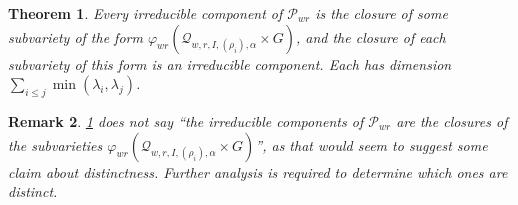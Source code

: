 \documentclass[12pt,psamsfonts]{article}
\newtheorem{theorem}{Theorem}[section]
\newtheorem{remark}[theorem]{Remark}
\begin{document}
\begin{theorem}\label{pwr_comps}
    Every irreducible component of \(\mathcal{P}_{wr}\) is the closure of some subvariety of the form \(\varphi_{wr}(\mathcal{Q}_{w,r,I,(\rho_i),\alpha} \times G)\), and the closure of each subvariety of this form is an irreducible component.
    Each has dimension \(\sum_{i \leq j} \min(\lambda_i, \lambda_j)\).
\end{theorem}
\begin{remark}
    \cref{pwr_comps} does not say ``the irreducible components of \(\mathcal{P}_{wr}\) are the closures of the subvarieties \(\varphi_{wr}(\mathcal{Q}_{w,r,I,(\rho_i),\alpha} \times G)\)'', as that would seem to suggest some claim about distinctness.
    Further analysis is required to determine which ones are distinct.
\end{remark}
\end{document}
